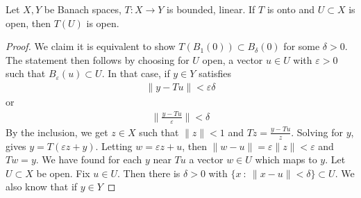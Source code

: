 \begin{theorem}
  \marginnote{ \scriptsize \it \textcolor{red}{review this}}
  Let $X, Y$ be Banach spaces, $T: X \to Y$ is bounded, linear. If
  $T$ is onto and $U \subset X$ is open, then $T(U)$ is open.
\end{theorem}
\begin{proof}
  We claim it is equivalent to show $T(B_1(0)) \subset B_\delta(0)$
  for some $\delta > 0$. The statement then follows by choosing for
  $U$ open, a vector $u \in U$ with $\varepsilon > 0$ such that
  $B_\varepsilon(u) \subset U$. In that case, if $y \in Y$ satisfies
  \begin{align*}
    \|y - Tu\| < \varepsilon \delta
  \end{align*}
  or
  \begin{align*}
    \|\frac{y-Tu}{\varepsilon}\| < \delta
  \end{align*}
  By the inclusion, we get $z \in X$ such that $\|z\| < 1$ and $Tz =
  \frac{y-Tu}{z}$. Solving for $y$, gives $y = T(\varepsilon z + y)$.
  Letting $w = \varepsilon z + u$, then $\|w - u\| = \varepsilon
  \|z\| < \varepsilon$ and $Tw = y$. We have found for each $y$ near
  $ Tu$ a vector $w \in U$ which maps to $y$.
  Let $U \subset X$ be open. Fix $u \in U$. Then there is $\delta >
  0$ with $ \{ x   \ : \  \|x - u\| < \delta \} \subset U$.
  We also know that if $y \in Y$


\end{proof}
